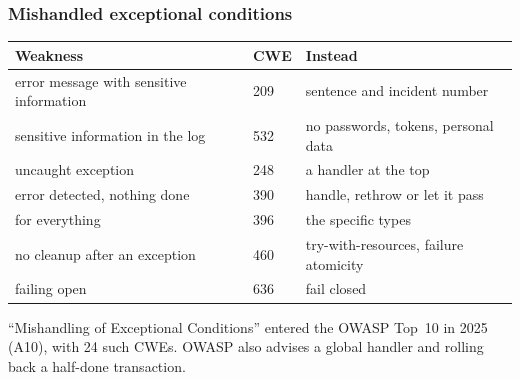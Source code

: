 \documentclass[aspectratio=169,10pt,compress]{beamer}
\begin{document}
\begin{frame}[t,fragile] \frametitle{Mishandled exceptional conditions}


\begin{table}
		\scriptsize
		\begin{tabular}{@{}L{0.42\textwidth}L{0.16\textwidth}L{0.34\textwidth}@{}}
			\toprule
			\textbf{Weakness} & \textbf{CWE} & \textbf{Instead} \\
			\midrule
			error message with sensitive information & 209 & sentence and incident number \\
			sensitive information in the log & 532 & no passwords, tokens, personal data \\
			uncaught exception & 248 & a handler at the top \\
			error detected, nothing done & 390 & handle, rethrow or let it pass \\
			 for everything & 396 & the specific types \\
			no cleanup after an exception & 460 & try-with-resources, failure atomicity \\
			failing open & 636 & fail closed \\
			\bottomrule
		\end{tabular}
\end{table}%

	\footnotesize ``Mishandling of Exceptional Conditions'' entered the OWASP Top~10 in 2025 (A10), with 24 such CWEs.
	OWASP also advises a global handler and rolling back a half-done transaction.
\end{frame}




\end{document}
